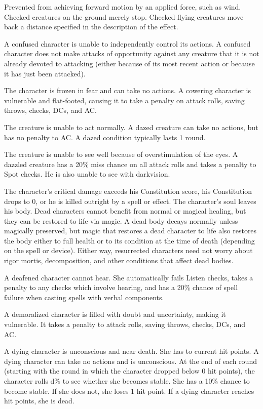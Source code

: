  Prevented from achieving forward motion by an applied force, such as wind. Checked creatures on the ground merely stop. Checked flying creatures move back a distance specified in the description of the effect.

 A confused character is unable to independently control its actions. \confusionexplanation A confused character does not make attacks of opportunity against any creature that it is not already devoted to attacking (either because of its most recent action or because it has just been attacked).

 The character is frozen in fear and can take no actions. A cowering character is vulnerable and flat-footed, causing it to take a  penalty on attack rolls, saving throws, checks, DCs, and AC.

 The creature is unable to act normally. A dazed creature can take no actions, but has no penalty to AC. A dazed condition typically lasts 1 round.

 The creature is unable to see well because of overstimulation of the eyes. A dazzled creature has a 20\% miss chance on all attack rolls and takes a  penalty to Spot checks. He is also unable to see with darkvision.

 The character's critical damage exceeds his Constitution score, his Constitution drops to 0, or he is killed outright by a spell or effect. The character's soul leaves his body. Dead characters cannot benefit from normal or magical healing, but they can be restored to life via magic. A dead body decays normally unless magically preserved, but magic that restores a dead character to life also restores the body either to full health or to its condition at the time of death (depending on the spell or device). Either way, resurrected characters need not worry about rigor mortis, decomposition, and other conditions that affect dead bodies.

 A deafened character cannot hear. She automatically fails Listen checks, takes a  penalty to any checks which involve hearing, and has a 20\% chance of spell failure when casting spells with verbal components.

 A demoralized character is filled with doubt and uncertainty, making it vulnerable. It takes a  penalty to attack rolls, saving throws, checks, DCs, and AC.

 A dying character is unconscious and near death. She has  to  current hit points. A dying character can take no actions and is unconscious. At the end of each round (starting with the round in which the character dropped below 0 hit points), the character rolls d\% to see whether she becomes stable. She has a 10\% chance to become stable. If she does not, she loses 1 hit point. If a dying character reaches  hit points, she is dead.

